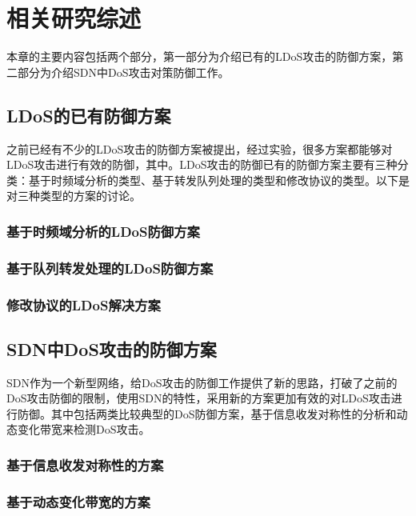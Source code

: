 \chapter{相关研究综述}
\label{cha:relatedWork}

本章的主要内容包括两个部分，第一部分为介绍已有的LDoS攻击的防御方案，第二部分为介绍SDN中DoS攻击对策防御工作。

\section{LDoS的已有防御方案}
\label{chap2:LDoSwork}
之前已经有不少的LDoS攻击的防御方案被提出，经过实验，很多方案都能够对LDoS攻击进行有效的防御，其中。LDoS攻击的防御已有的防御方案主要有三种分类：基于时频域分析的类型、基于转发队列处理的类型和修改协议的类型。以下是对三种类型的方案的讨论。


\subsection{基于时频域分析的LDoS防御方案}
\label{chap2:TFanalysis}



\subsection{基于队列转发处理的LDoS防御方案}
\label{chap2:queanalysis}

\subsection{修改协议的LDoS解决方案}
\label{chap2:promodify}

\section{SDN中DoS攻击的防御方案}
SDN作为一个新型网络，给DoS攻击的防御工作提供了新的思路，打破了之前的DoS攻击防御的限制，使用SDN的特性，采用新的方案更加有效的对LDoS攻击进行防御。其中包括两类比较典型的DoS防御方案，基于信息收发对称性的分析和动态变化带宽来检测DoS攻击。

\subsection{基于信息收发对称性的方案}
\label{chap2:srbalance}


\subsection{基于动态变化带宽的方案}
\label{chap2:dynamicbandwidth}
